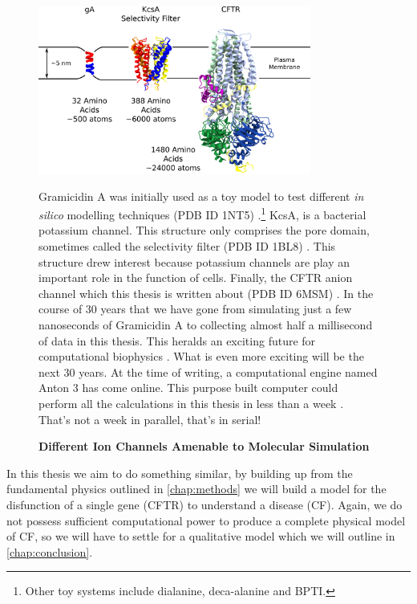 \begin{figure}
	\begin{center}
		\includegraphics[width=0.8\textwidth]{figures/ion_channel_progression.pdf}
	\end{center}
	\captionsetup{singlelinecheck = false, justification=raggedright}
	\caption[Different Ion Channels Amenable to Molecular Simulation] {\textbf{Different Ion Channels Amenable to Molecular Simulation}}{Gramicidin A was initially used as a toy model to test different \textit{in silico} modelling techniques (PDB ID 1NT5) \cite{sham2003}.\footnote{Other toy systems include dialanine, deca-alanine and BPTI.} KcsA, is a bacterial potassium channel. This structure only comprises the pore domain, sometimes called the selectivity filter (PDB ID 1BL8) \cite{doyle1998}. This structure drew interest because potassium channels are play an important role in the function of cells. Finally, the CFTR anion channel which this thesis is written about (PDB ID 6MSM) \cite{zhang2018a}. In the course of 30 years that we have gone from simulating just a few nanoseconds of Gramicidin A to collecting almost half a millisecond of data in this thesis. This heralds an exciting future for computational biophysics \cite{roux1993}. What is even more exciting will be the next 30 years. At the time of writing, a computational engine named Anton 3 has come online. This purpose built computer could perform all the calculations in this thesis in less than a week \cite{jones2022, russell2021}. That's not a week in parallel, that's in serial!}
	\label{ion_channel_progress}
\end{figure}

In this thesis we aim to do something similar, by building up from the fundamental physics outlined in \ref{chap:methods} we will build a model for the disfunction of a single gene (CFTR) to understand a disease (CF). Again, we do not possess sufficient computational power to produce a complete physical model of CF, so we will have to settle for a qualitative model which we will outline in \ref{chap:conclusion}. 

